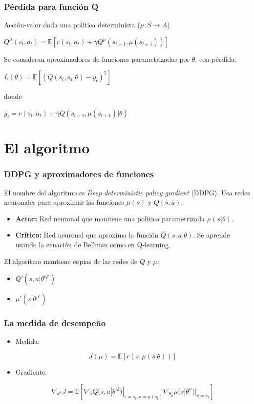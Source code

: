 \documentclass[
    11pt,
    aspectratio=169,
]{beamer}
\begin{document}
\begin{frame}
\frametitle{Pérdida para función Q}

Acción-valor dada una política determinista ($\mu : S \rightarrow A$)

$Q^{\mu} (s_t, a_t) = \mathbb{E} [r(s_t, a_t) + \gamma Q^{\mu} (s_{t+1}, \mu (s_{t+1}))]$

\pause

Se consideran aproximadores de funciones parametrizadas por $\theta$, con pérdida:

$L(\theta) = \mathbb{E} [(Q(s_t, a_t | \theta) - y_t)^2]$

donde

$y_t = r(s_t, a_t) + \gamma Q(s_{t+1},\mu (s_{t+1}) | \theta)$

\end{frame}

\section{El algoritmo}

\begin{frame}
\frametitle{DDPG y aproximadores de funciones}

El nombre del algoritmo es \textit{Deep deterministic policy gradient} (DDPG). Usa redes neuronales para aproximar las funciones $\mu(s)$ y $Q(s,a)$.

\begin{itemize}
\item \textbf{Actor:} Red neuronal que mantiene una política parametrizada $\mu (s| \theta)$.
\item \textbf{Crítico:} Red neuronal que aproxima la función $Q(s,a| \theta)$. Se aprende usando la ecuación de Bellman como en Q-learning.
\end{itemize}

\pause

El algoritmo mantiene copias de las redes de $Q$ y $\mu$:

\begin{itemize}
\item $Q' (s,a | \theta^{Q'})$
\item $\mu' (s | \theta^{\mu '})$
\end{itemize}

\end{frame}

\begin{frame}
\frametitle{La medida de desempeño}

\begin{itemize}
\item Medida:

$$ J(\mu) = \mathbb{E} [r(s, \mu (s | \theta))] $$

\item Gradiente:

$$\nabla_{\theta^{\mu}} J = \mathbb{E} [\nabla_a Q (s, a | \theta^Q) | _{s=s_t, a=\mu (s_t)} \nabla_{\theta_{\mu}} \mu (s | \theta^{\mu}) | _{s=s_t}]$$

\end{itemize}

\end{frame}
\end{document}
